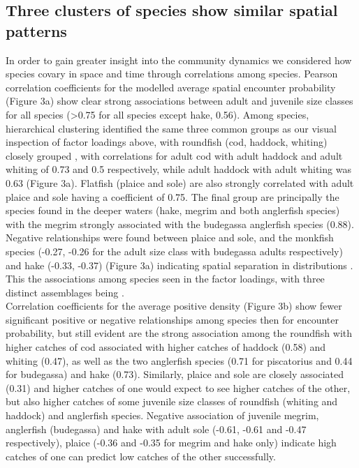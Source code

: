 \documentclass[fleqn,10pt]{wlscirep}
\begin{document}
\begin{linenumbers}
\subsection*{Three clusters of species show similar spatial patterns\\} In
order to gain greater insight into the community dynamics we considered how
species covary in space and time through correlations among species.  Pearson
correlation coefficients for the modelled average spatial encounter probability
(Figure 3a) show clear strong associations between adult and juvenile size
classes for all species (\textgreater 0.75 for all species except hake, 0.56).
Among species, hierarchical clustering identified the same three common
groups as our visual inspection of factor loadings
above, with roundfish (cod, haddock, whiting) closely grouped
, with correlations for adult cod with
adult haddock and adult whiting of 0.73 and 0.5 respectively, while adult
haddock with adult whiting was 0.63 (Figure 3a). Flatfish (plaice and sole) are
also strongly correlated with adult plaice and sole having a coefficient of
0.75.  The final group are principally the species found in the deeper waters
(hake, megrim and both anglerfish species) with the megrim strongly associated
with the budegassa anglerfish species (0.88). Negative relationships were found
between plaice and sole, and the monkfish species (-0.27, -0.26 for the adult
size class with budegassa adults respectively) and hake (-0.33, -0.37) (Figure
3a) indicating spatial separation in distributions . This
 the associations among species seen in
the factor loadings, with three distinct assemblages being
.\\

Correlation coefficients for the average positive density (Figure 3b) show
fewer significant positive or negative relationships among species then for
encounter probability, but still evident are the strong association among the
roundfish with higher catches of cod  associated with
higher catches of haddock (0.58) and whiting (0.47), as well as the two
anglerfish species (0.71 for piscatorius and 0.44 for budegassa) and hake
(0.73). Similarly, plaice and sole are closely associated (0.31) and higher
catches of one would expect to see higher catches of the other, but also higher
catches of some juvenile size classes of roundfish (whiting and haddock) and
anglerfish species. Negative association of juvenile megrim, anglerfish
(budegassa) and hake with adult sole (-0.61, -0.61 and -0.47 respectively),
plaice (-0.36 and -0.35 for megrim and hake only) indicate high catches of one
can predict low catches of the other successfully.\\


\end{linenumbers}
\end{document}
